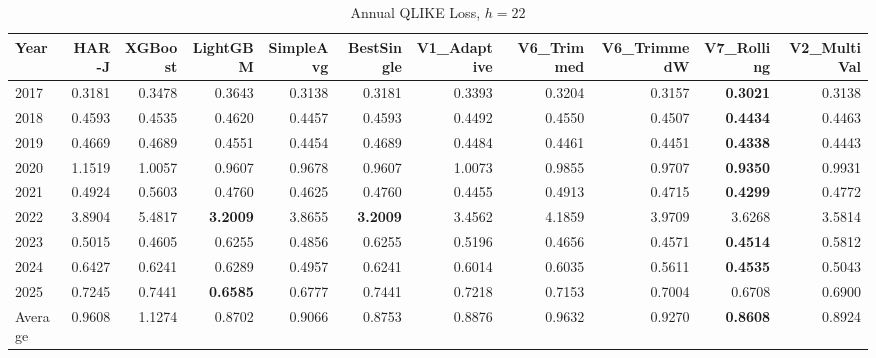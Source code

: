 \begin{table}[htbp]
\centering
\caption{Annual QLIKE Loss, $h=22$}
\label{tab:qlike_annual_h22}
\begin{tabular}{lrrrrrrrrrr}
\toprule
Year & HAR-J & XGBoost & LightGBM & SimpleAvg & BestSingle & V1\_Adaptive & V6\_Trimmed & V6\_TrimmedW & V7\_Rolling & V2\_MultiVal \\
\midrule
2017 & 0.3181 & 0.3478 & 0.3643 & 0.3138 & 0.3181 & 0.3393 & 0.3204 & 0.3157 & \textbf{0.3021} & 0.3138 \\
2018 & 0.4593 & 0.4535 & 0.4620 & 0.4457 & 0.4593 & 0.4492 & 0.4550 & 0.4507 & \textbf{0.4434} & 0.4463 \\
2019 & 0.4669 & 0.4689 & 0.4551 & 0.4454 & 0.4689 & 0.4484 & 0.4461 & 0.4451 & \textbf{0.4338} & 0.4443 \\
2020 & 1.1519 & 1.0057 & 0.9607 & 0.9678 & 0.9607 & 1.0073 & 0.9855 & 0.9707 & \textbf{0.9350} & 0.9931 \\
2021 & 0.4924 & 0.5603 & 0.4760 & 0.4625 & 0.4760 & 0.4455 & 0.4913 & 0.4715 & \textbf{0.4299} & 0.4772 \\
2022 & 3.8904 & 5.4817 & \textbf{3.2009} & 3.8655 & \textbf{3.2009} & 3.4562 & 4.1859 & 3.9709 & 3.6268 & 3.5814 \\
2023 & 0.5015 & 0.4605 & 0.6255 & 0.4856 & 0.6255 & 0.5196 & 0.4656 & 0.4571 & \textbf{0.4514} & 0.5812 \\
2024 & 0.6427 & 0.6241 & 0.6289 & 0.4957 & 0.6241 & 0.6014 & 0.6035 & 0.5611 & \textbf{0.4535} & 0.5043 \\
2025 & 0.7245 & 0.7441 & \textbf{0.6585} & 0.6777 & 0.7441 & 0.7218 & 0.7153 & 0.7004 & 0.6708 & 0.6900 \\
\midrule
Average & 0.9608 & 1.1274 & 0.8702 & 0.9066 & 0.8753 & 0.8876 & 0.9632 & 0.9270 & \textbf{0.8608} & 0.8924 \\
\bottomrule
\end{tabular}
\end{table}